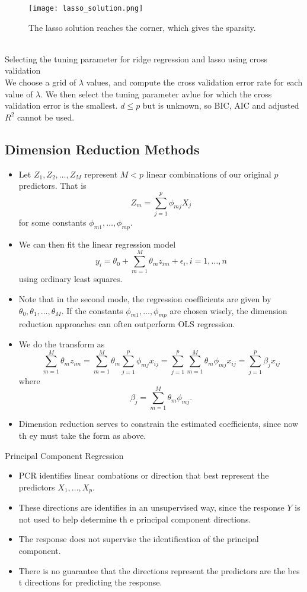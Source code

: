 \documentclass[11pt, a4paper]{article}
\begin{document}
\begin{figure}
[h!]
\centering
\texttt{[image: lasso\_solution.png]}
\caption{The lasso solution reaches the corner, which gives the sparsity.}
\end{figure}\\
Selecting the tuning parameter for ridge regression and lasso using cross validation\\
We choose a grid of $\lambda$ values, and compute the cross validation error rate for each value of $\lambda$. We then select the tuning parameter avlue for which the cross validation error is the smallest. $d\leq p$ but is unknown, so BIC, AIC and adjusted $R^2$ cannot be used.
\subsection{Dimension Reduction Methods}
\begin{itemize}
  \item Let $Z_1,Z_2,\dots,Z_M$ represent $M<p$ linear combinations of our original $p$ predictors. That is
\[
  Z_m=\sum_{j=1}^p\phi_{mj}X_j
\]
for some constants $\phi_{m1},\dots,\phi_{mp}$.
\item We can then fit the linear regression model
  \[
    y_i=\theta_0+\sum_{m=1}^M\theta_m z_{im}+\epsilon_i, i=1,\dots,n
  \]
using ordinary least squares.
\item Note that in the second mode, the regression coefficients are given by $\theta_0,\theta_1,\dots,\theta_M$. If the constants $\phi_{m1},\dots,\phi_{mp}$ are chosen wisely, the dimension reduction approaches can often outperform OLS regression.
\item We do the transform as
  \[
    \sum_{m=1}^M\theta_m z_{im}=\sum_{m=1}^M\theta_m\sum_{j=1}^p \phi_{mj}x_{ij}=\sum_{j=1}^p\sum_{m=1}^M\theta_m\phi_{mj}x_{ij}=\sum_{j=1}^p\beta_jx_{ij}
  \]
  where
  \[
    \beta_j=\sum_{m=1}^M\theta_m\phi_{mj}.
  \]
\item Dimension reduction serves to constrain the estimated coefficients, since now th ey must take the form as above.
\end{itemize}
Principal Component Regression
\begin{itemize}
  \item PCR identifies linear combations or direction that best represent the predictors $X_1,\dots,X_p$. 
  \item These directions are identifies in an unsupervised way, since the response $Y$ is not used to help determine th e principal component directions.
  \item The response does not supervise the identification of the principal component. 
  \item There is no guarantee that the directions represent the predictors are the bes t directions for predicting the response.
\end{itemize}
\end{document}
